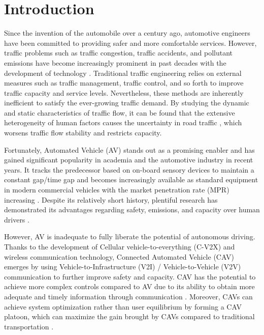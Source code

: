\documentclass[a4paper]{cas-sc}
\begin{document}
\maketitle

\section{Introduction}
\label{Section 1}

Since the invention of the automobile over a century ago, automotive engineers have been committed to providing safer and more comfortable services. However, traffic problems such as traffic congestion, traffic accidents, and pollutant emissions have become increasingly prominent in past decades with the development of technology \citep{Schrank2012,Jin2016}. Traditional traffic engineering relies on external measures such as traffic management, traffic control, and so forth to improve traffic capacity and service levels. Nevertheless, these methods are inherently inefficient to satisfy the ever-growing traffic demand. By studying the dynamic and static characteristics of traffic flow, it can be found that the extensive heterogeneity of human factors causes the uncertainty in road traffic \citep{Zhong2020,Ye2018,Arem2016,Yu2021}, which worsens traffic flow stability and restricts capacity.

Fortunately, Automated Vehicle (AV) stands out as a promising enabler and has gained significant popularity in academia and the automotive industry in recent years. It tracks the predecessor based on on-board sensory devices to maintain a constant gap/time gap and becomes increasingly available as standard equipment in modern commercial vehicles with the market penetration rate (MPR) increasing \citep{Wilson2011}. Despite its relatively short history, plentiful research has demonstrated its advantages regarding safety, emissions, and capacity over human drivers \citep{Wang2019,Sarker2019,Dey2015}.

However, AV is inadequate to fully liberate the potential of autonomous driving. Thanks to the development of Cellular vehicle-to-everything (C-V2X) and wireless communication technology, Connected Automated Vehicle (CAV) emerges by using Vehicle-to-Infrastructure (V2I) / Vehicle-to-Vehicle (V2V) communication to further improve safety and capacity. CAV has the potential to achieve more complex controls compared to AV due to its ability to obtain more adequate and timely information through communication \citep{Navas2019,Ruan2021,Zhou2021}. Moreover, CAVs can achieve system optimization rather than user equilibrium by forming a CAV platoon, which can maximize the gain brought by CAVs compared to traditional transportation \citep{Firooznia2017,Hu2021}.
\end{document}
